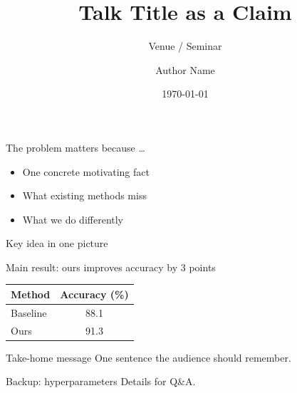\documentclass[aspectratio=169, 11pt]{beamer}
\title{Talk Title as a Claim}
\subtitle{Venue / Seminar}
\author{Author Name}
\institute{Affiliation}
\date{\today}
\begin{document}
\begin{frame}
  \titlepage
\end{frame}

\begin{frame}{The problem matters because \dots}
  \begin{itemize}
    \item<1-> One concrete motivating fact
    \item<2-> What existing methods miss
    \item<3-> What we do differently
  \end{itemize}
\end{frame}

\begin{frame}{Key idea in one picture}
  \centering
\end{frame}

\begin{frame}{Main result: ours improves accuracy by 3 points}
  \centering
  \begin{tabular}{lc}
    \toprule
    Method & Accuracy (\%) \\
    \midrule
    Baseline & 88.1 \\
    Ours     & \alert{91.3} \\
    \bottomrule
  \end{tabular}
\end{frame}

\begin{frame}{Take-home message}
  \Large One sentence the audience should remember.
\end{frame}

\appendix
\begin{frame}{Backup: hyperparameters}
  Details for Q\&A.
\end{frame}
\end{document}
